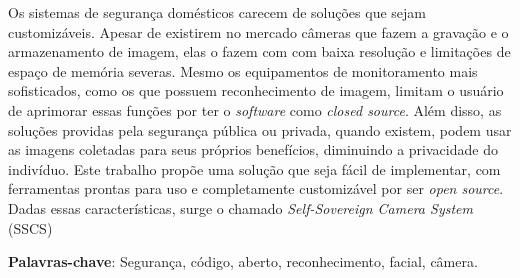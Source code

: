 \documentclass[12pt, %
openright, 
oneside, %
a4paper,    %
brazil]{facom-ufu-abntex2}
\begin{document}



\begin{resumo} %
	Os sistemas de segurança domésticos carecem de soluções
	que sejam customizáveis. Apesar de existirem no mercado câmeras que fazem a gravação e o armazenamento de
	imagem, elas o fazem com com baixa resolução e limitações de espaço de memória severas. Mesmo os equipamentos
	de monitoramento mais sofisticados, como os que possuem reconhecimento de imagem, limitam o usuário de aprimorar
	essas funções por ter o \textit{\foreignlanguage{english}{software}} como \textit{\foreignlanguage{english}{closed source}}.
	Além disso, as soluções providas pela segurança pública ou privada, quando existem, podem usar as imagens
	coletadas para seus próprios benefícios, diminuindo a privacidade do indivíduo. Este trabalho propõe uma solução que seja
	fácil de implementar, com ferramentas prontas para uso e completamente customizável por ser \textit{\foreignlanguage{english}{open source}}.
	Dadas essas características, surge o chamado \textit{\foreignlanguage{english}{Self-Sovereign Camera System}} (SSCS)
	\vspace{\onelineskip}

	\noindent
	\textbf{Palavras-chave}: Segurança, código,  aberto, reconhecimento, facial, câmera.  %
\end{resumo}

\listoffigures*
\cleardoublepage

\listoftables*
\cleardoublepage
\end{document}
